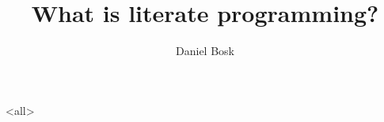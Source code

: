\documentclass[ignoreframetext]{beamer}
\begin{document}
\title{%
  What is literate programming?
}
\author{%
  Daniel Bosk
}


\begin{frame}
  \maketitle
\end{frame}

\begin{abstract}
  
\end{abstract}

\clearpage

\begin{frame}
\end{frame}

\clearpage

\mode<all>

\mode*
\end{document}
